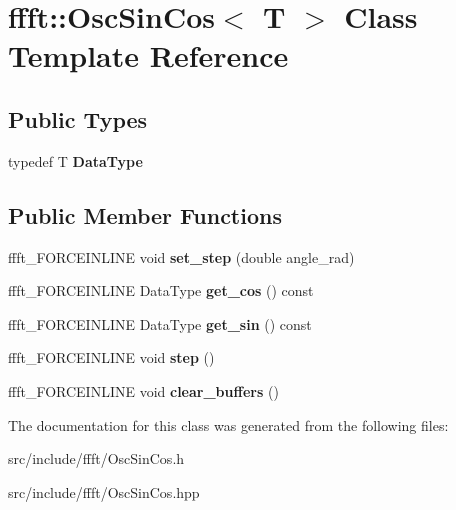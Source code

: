 \hypertarget{classffft_1_1OscSinCos}{}\section{ffft\+:\+:Osc\+Sin\+Cos$<$ T $>$ Class Template Reference}
\label{classffft_1_1OscSinCos}
\subsection*{Public Types}
\begin{DoxyCompactItemize}
\item 
\mbox{\label{classffft_1_1OscSinCos_af91237051e92ce0af7aaf38b1826244d}} 
typedef T {\bfseries Data\+Type}
\end{DoxyCompactItemize}
\subsection*{Public Member Functions}
\begin{DoxyCompactItemize}
\item 
\mbox{\label{classffft_1_1OscSinCos_ad41139a76b16a5af136d1e730a9143dc}} 
ffft\+\_\+\+F\+O\+R\+C\+E\+I\+N\+L\+I\+NE void {\bfseries set\+\_\+step} (double angle\+\_\+rad)
\item 
\mbox{\label{classffft_1_1OscSinCos_a88766d022a8e0067f987c170b9afd68a}} 
ffft\+\_\+\+F\+O\+R\+C\+E\+I\+N\+L\+I\+NE Data\+Type {\bfseries get\+\_\+cos} () const
\item 
\mbox{\label{classffft_1_1OscSinCos_a842c33c2ed314cf62be6d273af00c416}} 
ffft\+\_\+\+F\+O\+R\+C\+E\+I\+N\+L\+I\+NE Data\+Type {\bfseries get\+\_\+sin} () const
\item 
\mbox{\label{classffft_1_1OscSinCos_a442975ce6388271ea78998c080364e08}} 
ffft\+\_\+\+F\+O\+R\+C\+E\+I\+N\+L\+I\+NE void {\bfseries step} ()
\item 
\mbox{\label{classffft_1_1OscSinCos_a1be4a9ec10517ae2615d2925c05d7d29}} 
ffft\+\_\+\+F\+O\+R\+C\+E\+I\+N\+L\+I\+NE void {\bfseries clear\+\_\+buffers} ()
\end{DoxyCompactItemize}


The documentation for this class was generated from the following files\+:\begin{DoxyCompactItemize}
\item 
src/include/ffft/Osc\+Sin\+Cos.\+h\item 
src/include/ffft/Osc\+Sin\+Cos.\+hpp\end{DoxyCompactItemize}
